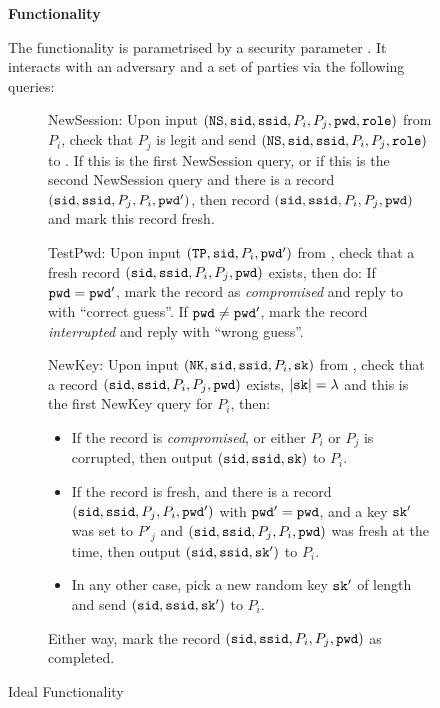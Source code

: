 \begin{figure}[h!]
\begin{mdframed}[innertopmargin=10pt]
\begin{center}
{\bf Functionality \cFPAKE}
\end{center}
The functionality \cFPAKE is parametrised by a security parameter \secpar. It interacts with an adversary \cS and a set of parties via the following queries:
\begin{description}
	\item[]NewSession: Upon input $(\mathtt{NS}, \mathtt{sid}, \mathtt{ssid}, P_i, P_j, \mathtt{pwd}, \mathtt{role})$ from $P_i$, check that $P_j$ is legit and send $(\mathtt{NS}, \mathtt{sid}, \mathtt{ssid}, P_i, P_j, \mathtt{role})$ to \cS.
	If this is the first NewSession query, or if this is the second NewSession query and there is a record $(\mathtt{sid}, \mathtt{ssid}, P_j,P_i,\mathtt{pwd}')$, then record $(\mathtt{sid}, \mathtt{ssid}, P_i, P_j, \mathtt{pwd})$ and mark this record fresh.
	
	\item[]TestPwd: Upon input $(\mathtt{TP}, \mathtt{sid}, P_i, \mathtt{pwd}')$ from \cS, check that a fresh record $(\mathtt{sid}, \mathtt{ssid}, P_i, P_j, \mathtt{pwd})$ exists, then do:
	If $\mathtt{pwd}=\mathtt{pwd}'$, mark the record as \emph{compromised} and reply to \cS with ``correct guess''. If $\mathtt{pwd}\not=\mathtt{pwd}'$, mark the record \emph{interrupted} and reply with ``wrong guess''.
	
	\item[]NewKey: Upon input $(\mathtt{NK}, \mathtt{sid}, \mathtt{ssid}, P_i, \mathtt{sk})$ from \cS, check that a record $(\mathtt{sid}, \mathtt{ssid}, P_i, P_j, \mathtt{pwd})$ exists, $|\mathtt{sk}|=\lambda$ and this is the first NewKey query for $P_i$, then:
	\begin{itemize}
		\item If the record is \emph{compromised}, or either $P_i$ or $P_j$ is corrupted, then output $(\mathtt{sid},\mathtt{ssid},\mathtt{sk})$ to $P_i$.
		\item If the record is fresh, and there is a record $(\mathtt{sid}, \mathtt{ssid}, P_j, P_i, \mathtt{pwd}')$ with $\mathtt{pwd}'=\mathtt{pwd}$, and a key $\mathtt{sk}'$ was set to $P'_j$ and $(\mathtt{sid}, \mathtt{ssid}, P_j,P_i,\mathtt{pwd})$ was fresh at the time, then output $(\mathtt{sid},\mathtt{ssid},\mathtt{sk}')$ to $P_i$.
		\item In any other case, pick a new random key $\mathtt{sk}'$ of length \secpar and send $(\mathtt{sid},\mathtt{ssid},\mathtt{sk}')$ to $P_i$.
	\end{itemize}
	Either way, mark the record $(\mathtt{sid},\mathtt{ssid},P_i,P_j,\mathtt{pwd})$ as completed.
	
\end{description}
\end{mdframed}
\caption{Ideal Functionality \cFPAKE}
\label{fig:pakef}
\end{figure}

